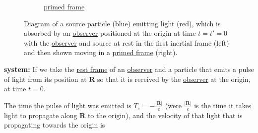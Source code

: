 \begin{figure}[ht]
\begin{subfigure}[b]{.49\textwidth}
		\caption{\hyperlink{def-Primed-Frame}{primed frame}}
	\end{subfigure}
	\caption{Diagram of a source particle (blue) emitting light (red), which is absorbed by an \protect\hyperlink{def-observer}{observer} positioned at the origin at time ${t} = {t{'}} = 0$ with the \protect\hyperlink{def-observer}{observer} and source at rest in the first inertial frame (left) and then shown moving in a \protect\hyperlink{def-Primed-Frame}{primed frame} (right).}
	\label{fig: Retarded field}
\end{figure}

\noindent
\textbf{system:} \newline
If we take the \hyperlink{def-proper-frame}{rest frame} of an \hyperlink{def-observer}{observer} and a particle that emits a pulse of light from its position at ${\mathbf{R}}$ so that it is received by the \hyperlink{def-observer}{observer} at the origin, at time ${t} = 0$.

The time the pulse of light was emitted is ${T}_{e} =-\frac{|\mathbf{R}|}{c}$ (were $\frac{|{\mathbf{R}}|}{c}$ is the time it takes light to propagate along ${\mathbf{R}}$ to the origin), and the velocity of that light that is propagating towards the origin is

